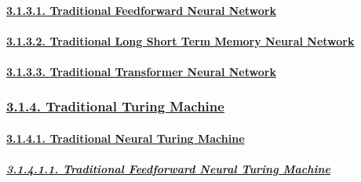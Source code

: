 \documentclass[
]{article}
\begin{document}
\hypertarget{traditional-feedforward-neural-network}{%
\paragraph{\texorpdfstring{\protect\hyperlink{traditional-feedforward-neural-network-1}{3.1.3.1.
Traditional Feedforward Neural
Network}}{3.1.3.1. Traditional Feedforward Neural Network}}\label{traditional-feedforward-neural-network}}

\hypertarget{traditional-long-short-term-memory-neural-network}{%
\paragraph{\texorpdfstring{\protect\hyperlink{traditional-long-short-term-memory-neural-network-1}{3.1.3.2.
Traditional Long Short Term Memory Neural
Network}}{3.1.3.2. Traditional Long Short Term Memory Neural Network}}\label{traditional-long-short-term-memory-neural-network}}

\hypertarget{traditional-transformer-neural-network}{%
\paragraph{\texorpdfstring{\protect\hyperlink{traditional-transformer-neural-network-1}{3.1.3.3.
Traditional Transformer Neural
Network}}{3.1.3.3. Traditional Transformer Neural Network}}\label{traditional-transformer-neural-network}}

\hypertarget{traditional-turing-machine}{%
\subsubsection{\texorpdfstring{\protect\hyperlink{traditional-turing-machine-1}{3.1.4.
Traditional Turing
Machine}}{3.1.4. Traditional Turing Machine}}\label{traditional-turing-machine}}

\hypertarget{traditional-neural-turing-machine}{%
\paragraph{\texorpdfstring{\protect\hyperlink{traditional-neural-turing-machine-1}{3.1.4.1.
Traditional Neural Turing
Machine}}{3.1.4.1. Traditional Neural Turing Machine}}\label{traditional-neural-turing-machine}}

\hypertarget{traditional-feedforward-neural-turing-machine}{%
\subparagraph{\texorpdfstring{\protect\hyperlink{traditional-feedforward-neural-turing-machine-1}{3.1.4.1.1.
Traditional Feedforward Neural Turing
Machine}}{3.1.4.1.1. Traditional Feedforward Neural Turing Machine}}\label{traditional-feedforward-neural-turing-machine}}
\end{document}
